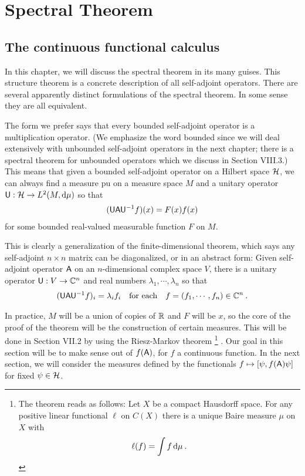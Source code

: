 \section{Spectral Theorem}

\subsection{The continuous functional calculus}

In this chapter, we will discuss the spectral theorem in its many guises. This structure theorem is a concrete description of all self-adjoint operators. There are several apparently distinct formulations of the spectral theorem. In some sense they are all equivalent.

The form we prefer says that every bounded self-adjoint operator is a multiplication operator. (We emphasize the word bounded since we will deal extensively with unbounded self-adjoint operators in the next chapter; there is a spectral theorem for unbounded operators which we discuss in Section VIII.3.) This means that given a bounded self-adjoint operator on a Hilbert space $\mathcal{H}$, we can always find a measure pu on a measure space $M$ and a unitary operator $\mathsf{U}: \mathcal{H} \to L^{2}(M, \mathrm{d} \mu)$ so that
\begin{align}
    (\mathsf{U} \mathsf{A} \mathsf{U}^{-1} f)(x) = F(x)f(x)
\end{align}
for some bounded real-valued measurable function $F$ on $M$.

This is clearly a generalization of the finite-dimensional theorem, which says any self-adjoint $n \times n$ matrix can be diagonalized, or in an abstract form: Given self-adjoint operator $\mathsf{A}$ on an $n$-dimensional complex space $V$,
there is a unitary operator $\mathsf{U}: V \to \mathbb{C}^n$ and real numbers $\lambda_1, \cdots, \lambda_n$ so that \begin{align}
    (\mathsf{U} \mathsf{A} \mathsf{U}^{-1} f)_i = \lambda_i f_i \quad \text{for each} \quad f = (f_1, \cdots, f_n) \in \mathbb{C}^n \:.
\end{align}

In practice, $M$ will be a union of copies of $\mathbb{R}$ and $F$ will be $x$, so the core of the proof of the theorem will be the construction of certain measures.
This will be done in Section VII.2 by using the Riesz-Markov theorem
\footnote{
    The theorem reads as follows: Let $X$ be a compact Hausdorff space. For any positive linear functional $\ell$ on $C(X)$ there is a unique Baire measure $\mu$ on $X$ with 
\begin{align*} 
    \ell(f) = \int f \, \mathrm{d} \mu \:.
\end{align*}
}
. Our goal in this section will be to make sense out of $f(\mathsf{A})$, for $f$ a continuous function. In the next section, we will consider the measures defined by the functionals $f \mapsto [\psi, f(\mathsf{A}) \psi]$ for fixed $\psi \in \mathcal{H}$.

